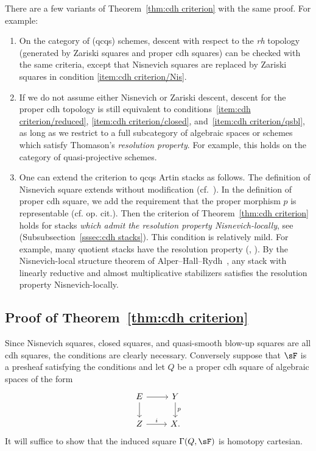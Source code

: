 \begin{rema}\label{rem:variants of cdh criterion}
There are a few variants of Theorem~\ref{thm:cdh criterion} with the same proof. For example:
\begin{enumerate}\romanenumi
\item On the category of (qcqs) schemes, descent with respect to the \emph{rh} topology (generated by Zariski squares and proper cdh squares) can be checked with the same criteria, except that Nisnevich squares are replaced by Zariski squares in condition
\eqref{item:cdh criterion/Nis}.
\item If we do not assume either Nisnevich or Zariski descent, descent for the proper cdh topology is still equivalent to conditions~\eqref{item:cdh criterion/reduced},
\eqref{item:cdh criterion/closed}, and~\eqref{item:cdh criterion/qsbl}, as long as we restrict to a full subcategory of algebraic spaces or schemes which satisfy Thomason's \emph{resolution property}. For example, this holds on the category of quasi-projective schemes.
\item \label{item:variants of cdh criterion/stacks}
One can extend the criterion to qcqs Artin stacks as follows. The definition of Nisnevich square extends without modification (cf.~\cite[Subsection~2.3]{HoyoisKrishna}). In the definition of proper cdh square, we add the requirement that the proper morphism $p$ is representable (cf. op. cit.). Then the criterion of Theorem~\ref{thm:cdh criterion} holds for stacks \emph{which admit the resolution property Nisnevich-locally}, see (Subsubsection~\ref{sssec:cdh stacks}). This condition is relatively mild. For example, many quotient stacks have the resolution property (\cite[Lemma~2.4]{ThomasonEquivariant}, \cite[Example~7.5]{HallRydhPerfect}). By the Nisnevich-local structure theorem of Alper--Hall--Rydh~\cite[Theorem~2.9]{HoyoisKrishna}, any stack with linearly reductive and almost multiplicative stabilizers satisfies the resolution property Nisnevich-locally.
\end{enumerate}
\end{rema}

\subsection{Proof of Theorem~\ref{thm:cdh criterion}}

Since Nisnevich squares, closed squares, and quasi-smooth blow-up squares are all cdh squares, the conditions are clearly necessary. Conversely suppose that $\sF$ is a presheaf satisfying the conditions and let $Q$ be a proper cdh square of algebraic spaces of the form
\begin{equation}\label{eq:proper cdh in proof}
\begin{tikzcd}
E \ar{r}\ar{d} & Y \ar{d}{p}
\\
Z \ar{r}{i} & X.
\end{tikzcd}
\end{equation}
It will suffice to show that the induced square $\Gamma(Q, \sF)$ is homotopy cartesian.

